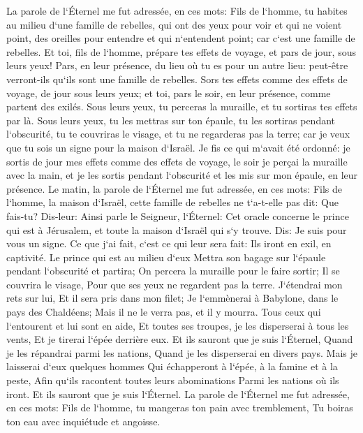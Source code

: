 \verse La parole de l`Éternel me fut adressée, en ces mots: 
\verse Fils de l`homme, tu habites au milieu d`une famille de rebelles, qui ont des yeux pour voir et qui ne voient point, des oreilles pour entendre et qui n`entendent point; car c`est une famille de rebelles. 
\verse Et toi, fils de l`homme, prépare tes effets de voyage, et pars de jour, sous leurs yeux! Pars, en leur présence, du lieu où tu es pour un autre lieu: peut-être verront-ils qu`ils sont une famille de rebelles. 
\verse Sors tes effets comme des effets de voyage, de jour sous leurs yeux; et toi, pars le soir, en leur présence, comme partent des exilés. 
\verse Sous leurs yeux, tu perceras la muraille, et tu sortiras tes effets par là. 
\verse Sous leurs yeux, tu les mettras sur ton épaule, tu les sortiras pendant l`obscurité, tu te couvriras le visage, et tu ne regarderas pas la terre; car je veux que tu sois un signe pour la maison d`Israël. 
\verse Je fis ce qui m`avait été ordonné: je sortis de jour mes effets comme des effets de voyage, le soir je perçai la muraille avec la main, et je les sortis pendant l`obscurité et les mis sur mon épaule, en leur présence. 
\verse Le matin, la parole de l`Éternel me fut adressée, en ces mots: 
\verse Fils de l`homme, la maison d`Israël, cette famille de rebelles ne t`a-t-elle pas dit: Que fais-tu? 
\verse Dis-leur: Ainsi parle le Seigneur, l`Éternel: Cet oracle concerne le prince qui est à Jérusalem, et toute la maison d`Israël qui s`y trouve. 
\verse Dis: Je suis pour vous un signe. Ce que j`ai fait, c`est ce qui leur sera fait: Ils iront en exil, en captivité. 
\verse Le prince qui est au milieu d`eux Mettra son bagage sur l`épaule pendant l`obscurité et partira; On percera la muraille pour le faire sortir; Il se couvrira le visage, Pour que ses yeux ne regardent pas la terre. 
\verse J`étendrai mon rets sur lui, Et il sera pris dans mon filet; Je l`emmènerai à Babylone, dans le pays des Chaldéens; Mais il ne le verra pas, et il y mourra. 
\verse Tous ceux qui l`entourent et lui sont en aide, Et toutes ses troupes, je les disperserai à tous les vents, Et je tirerai l`épée derrière eux. 
\verse Et ils sauront que je suis l`Éternel, Quand je les répandrai parmi les nations, Quand je les disperserai en divers pays. 
\verse Mais je laisserai d`eux quelques hommes Qui échapperont à l`épée, à la famine et à la peste, Afin qu`ils racontent toutes leurs abominations Parmi les nations où ils iront. Et ils sauront que je suis l`Éternel. 
\verse La parole de l`Éternel me fut adressée, en ces mots: 
\verse Fils de l`homme, tu mangeras ton pain avec tremblement, Tu boiras ton eau avec inquiétude et angoisse. 
